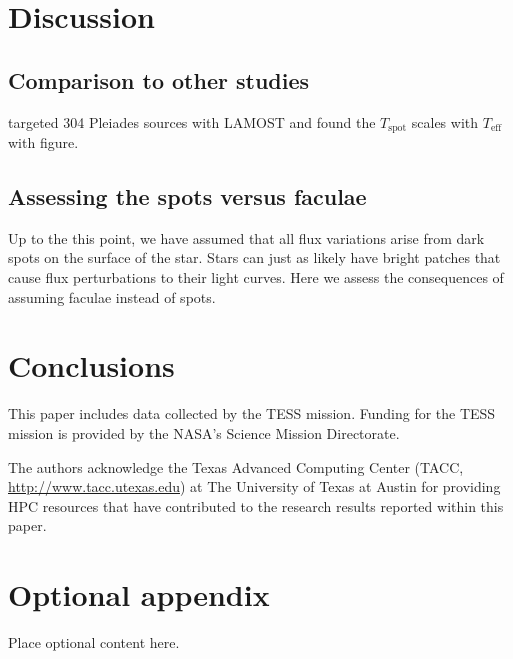 \documentclass[modern]{aastex631}
\begin{document}
\section{Discussion}

\subsection{Comparison to other studies}
\citet{2016MNRAS.463.2494F} targeted 304 Pleiades sources with LAMOST and found the $T_{\mathrm{spot}}$ scales with $T_{\mathrm{eff}}$ with figure.

\subsection{Assessing the spots versus faculae}
Up to the this point, we have assumed that all flux variations arise from dark spots on the surface of the star. Stars can just as likely have bright patches that cause flux perturbations to their light curves. Here we assess the consequences of assuming faculae instead of spots.

\section{Conclusions}

\begin{acknowledgements}
  This paper includes data collected by the TESS mission. Funding for the TESS mission is provided by the NASA's Science Mission Directorate.

  The authors acknowledge the Texas Advanced Computing Center (TACC, \url{http://www.tacc.utexas.edu}) at The University of Texas at Austin for providing HPC resources that have contributed to the research results reported within this paper.
\end{acknowledgements}

\clearpage








\clearpage

\appendix
\restartappendixnumbering

\section{Optional appendix} \label{appendix:tools}

Place optional content here.
\end{document}
